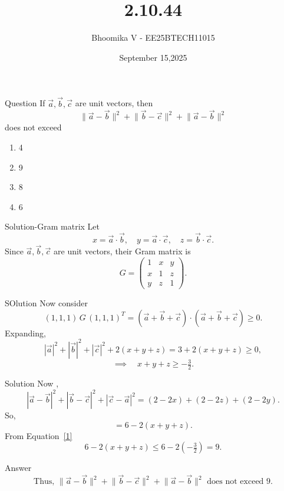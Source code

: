 \documentclass{beamer}
\begin{document}
\title 
{2.10.44}
\date{September 15,2025}


\author 
{Bhoomika V - EE25BTECH11015}




\frame{\titlepage}
\begin{frame}{Question}
If $\vec{a}, \vec{b}, \vec{c}$ are unit vectors, then
\[
\lVert \vec{a} - \vec{b} \rVert^2
+ \lVert \vec{b} - \vec{c} \rVert^2
+ \lVert \vec{a} - \vec{b} \rVert^2
\]
does not exceed
\begin{enumerate}[label=\alph*)] %
    \item 4
    \item 9
    \item 8
    \item 6
\end{enumerate}
\end{frame}

\begin{frame}{Solution-Gram matrix}
Let 
\[
x = \vec{a}\cdot \vec{b}, \quad y = \vec{a}\cdot \vec{c}, \quad z = \vec{b}\cdot \vec{c}.
\]
Since $\vec{a},\vec{b},\vec{c}$ are unit vectors, their Gram matrix is
\[
G = \begin{pmatrix}
1 & x & y \\
x & 1 & z \\
y & z & 1
\end{pmatrix}.
\]
\end{frame}

\begin{frame}{SOlution}
Now consider
\[
(1,1,1) \, G \, (1,1,1)^T = (\vec{a}+\vec{b}+\vec{c}) \cdot (\vec{a}+\vec{b}+\vec{c}) \geq 0.
\]
Expanding,
\[
|\vec{a}|^2 + |\vec{b}|^2 + |\vec{c}|^2 + 2(x+y+z) = 3 + 2(x+y+z) \geq 0,
\]
\begin{equation}
\implies \quad x+y+z \geq -\tfrac{3}{2}.
\label{1}
\end{equation}
\end{frame}

\begin{frame}{Solution}
Now ,
\[
|\vec{a}-\vec{b}|^2 + |\vec{b}-\vec{c}|^2 + |\vec{c}-\vec{a}|^2
= (2-2x) + (2-2z) + (2-2y).
\]
So,
\[
= 6 - 2(x+y+z).
\]
From Equation~\eqref{1}
\[
6 - 2(x+y+z) \leq 6 - 2\left(-\tfrac{3}{2}\right) = 9.
\]

\end{frame}

\begin{frame}{Answer}
\[
\text{Thus, } 
\lVert \vec{a} - \vec{b} \rVert^2
+ \lVert \vec{b} - \vec{c} \rVert^2
+ \lVert \vec{a} - \vec{b} \rVert^2
\text{ does not exceed } 9.
\]
\end{frame}
\end{document}

